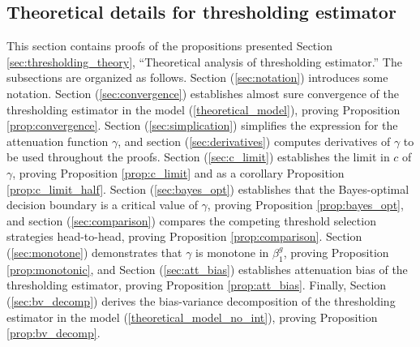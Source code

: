 \documentclass[12pt]{article}
\begin{document}

\newpage


\begin{appendices}
\section{Theoretical details for thresholding estimator}
This section contains proofs of the propositions presented Section \ref{sec:thresholding_theory}, ``Theoretical analysis of thresholding estimator.'' The subsections are organized as follows. Section (\ref{sec:notation}) introduces some notation. Section (\ref{sec:convergence}) establishes almost sure convergence of the thresholding estimator in the model (\ref{theoretical_model}), proving Proposition \ref{prop:convergence}. Section (\ref{sec:simplication}) simplifies the expression for the attenuation function $\gamma$, and section (\ref{sec:derivatives})  computes derivatives of $\gamma$ to be used throughout the proofs. Section (\ref{sec:c_limit}) establishes the limit in $c$ of $\gamma$, proving Proposition \ref{prop:c_limit} and as a corollary Proposition \ref{prop:c_limit_half}. Section (\ref{sec:bayes_opt}) establishes that the Bayes-optimal decision boundary is a critical value of $\gamma$, proving Proposition \ref{prop:bayes_opt}, and section (\ref{sec:comparison}) compares the competing threshold selection strategies head-to-head, proving Proposition \ref{prop:comparison}. Section (\ref{sec:monotone}) demonstrates that $\gamma$ is monotone in $\beta^g_1$, proving Proposition \ref{prop:monotonic}, and Section (\ref{sec:att_bias}) establishes attenuation bias of the thresholding estimator, proving Proposition \ref{prop:att_bias}. Finally, Section (\ref{sec:bv_decomp}) derives the bias-variance decomposition of the thresholding estimator in the model (\ref{theoretical_model_no_int}), proving Proposition \ref{prop:bv_decomp}.




\end{appendices}
\end{document}
